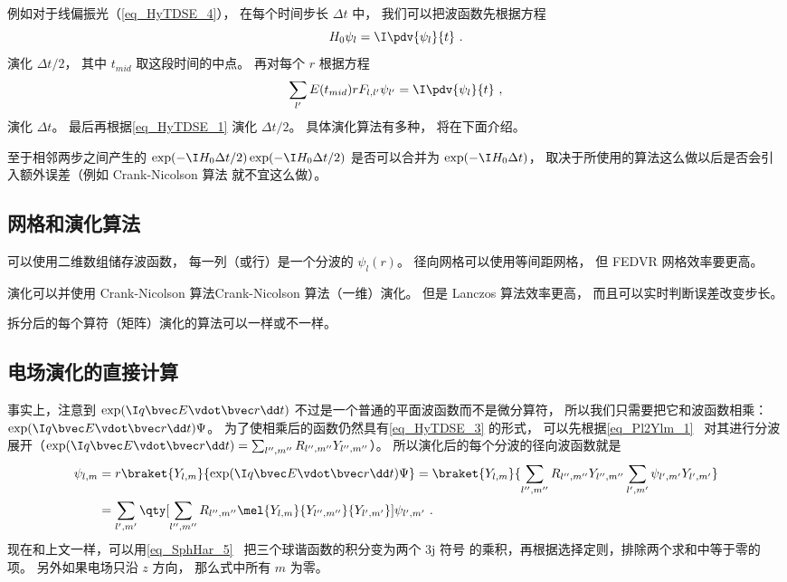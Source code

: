 例如对于线偏振光（\autoref{eq_HyTDSE_4}）， 在每个时间步长 $\Delta t$ 中， 我们可以把波函数先根据方程
\begin{equation}\label{eq_HyTDSE_1}
H_0 \psi_{l} = \I \pdv{\psi_{l}}{t}~.
\end{equation}
演化 $\Delta t/2$， 其中 $t_{mid}$ 取这段时间的中点。 再对每个 $r$ 根据方程
\begin{equation}\label{eq_HyTDSE_9}
\sum_{l'} E(t_{mid})rF_{l, l'} \psi_{l'} = \I \pdv{\psi_{l}}{t}~,
\end{equation}
演化 $\Delta t$。 最后再根据\autoref{eq_HyTDSE_1} 演化 $\Delta t/2$。 具体演化算法有多种， 将在下面介绍。

至于相邻两步之间产生的 $\exp(-\I H_0 {\Delta t}/{2})\exp(-\I H_0 {\Delta t}/{2})$ 是否可以合并为 $\exp(-\I H_0 {\Delta t})$， 取决于所使用的算法这么做以后是否会引入额外误差（例如 Crank-Nicolson 算法 就不宜这么做）。

\subsection{网格和演化算法}

可以使用二维数组储存波函数， 每一列（或行）是一个分波的 $\psi_l(r)$。 径向网格可以使用等间距网格， 但 FEDVR 网格效率要更高。

演化可以并使用 Crank-Nicolson 算法Crank-Nicolson 算法（一维）演化。 但是 Lanczos 算法效率更高， 而且可以实时判断误差改变步长。

拆分后的每个算符（矩阵）演化的算法可以一样或不一样。

\subsection{电场演化的直接计算}
事实上，注意到 $\exp(\I q\bvec E\vdot\bvec r\dd t)$ 不过是一个普通的平面波函数而不是微分算符， 所以我们只需要把它和波函数相乘： $\exp(\I q\bvec E\vdot\bvec r\dd t)\Psi$。 为了使相乘后的函数仍然具有\autoref{eq_HyTDSE_3} 的形式， 可以先根据\autoref{eq_Pl2Ylm_1}~ 对其进行分波展开（$\exp(\I q\bvec E\vdot\bvec r\dd t) = \sum_{l'',m''}R_{l'',m''}Y_{l'',m''}$）。 所以演化后的每个分波的径向波函数就是
\begin{equation}\label{eq_HyTDSE_24}
\begin{aligned}
\psi_{l,m} &= r\braket{Y_{l,m}}{\exp(\I q\bvec E\vdot\bvec r\dd t)\Psi} =
\braket{Y_{l,m}}{\sum_{l'',m''} R_{l'',m''} Y_{l'',m''} \sum_{l',m'} \psi_{l',m'} Y_{l',m'}}\\
&= \sum_{l',m'} \qty[\sum_{l'',m''}R_{l'',m''}  \mel{Y_{l,m}}{Y_{l'',m''}}{Y_{l',m'}}]\psi_{l',m'}~.
\end{aligned}
\end{equation}
现在和上文一样，可以用\autoref{eq_SphHar_5}~ 把三个球谐函数的积分变为两个 3j 符号 的乘积，再根据选择定则，排除两个求和中等于零的项。 另外如果电场只沿 $z$ 方向， 那么式中所有 $m$ 为零。

